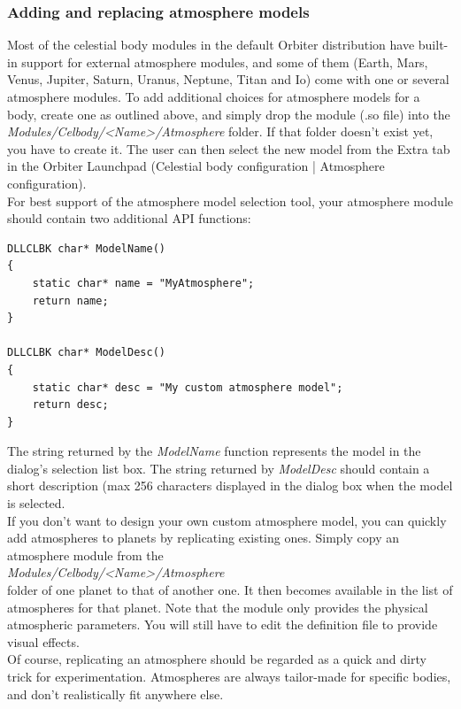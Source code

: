 \documentclass[Orbiter Developer Manual.tex]{subfiles}
\begin{document}
\subsubsection{Adding and replacing atmosphere models}
Most of the celestial body modules in the default Orbiter distribution have built-in support for external atmosphere modules, and some of them (Earth, Mars, Venus, Jupiter, Saturn, Uranus, Neptune, Titan and Io) come with one or several atmosphere modules. To add additional choices for atmosphere models for a body, create one as outlined above, and simply drop the module (.so file) into the \textit{Modules/Celbody/<Name>/Atmosphere} folder. If that folder doesn't exist yet, you have to create it. The user can then select the new model from the Extra tab in the Orbiter Launchpad (Celestial body configuration | Atmosphere configuration).\\
For best support of the atmosphere model selection tool, your atmosphere module should contain two additional API functions:

\begin{lstlisting}
DLLCLBK char* ModelName()
{
	static char* name = "MyAtmosphere";
	return name;
}

DLLCLBK char* ModelDesc()
{
	static char* desc = "My custom atmosphere model";
	return desc;
}
\end{lstlisting}

\noindent
The string returned by the \textit{ModelName} function represents the model in the dialog's selection list box. The string returned by \textit{ModelDesc} should contain a short description (max 256 characters displayed in the dialog box when the model is selected.\\
If you don't want to design your own custom atmosphere model, you can quickly add atmospheres to planets by replicating existing ones. Simply copy an atmosphere module from the\\
\indent \textit{Modules/Celbody/<Name>/Atmosphere}\\
folder of one planet to that of another one. It then becomes available in the list of atmospheres for that planet. Note that the module only provides the physical atmospheric parameters. You will still have to edit the definition file to provide visual effects.\\
Of course, replicating an atmosphere should be regarded as a quick and dirty trick for experimentation. Atmospheres are always tailor-made for specific bodies, and don't realistically fit anywhere else.
\end{document}
